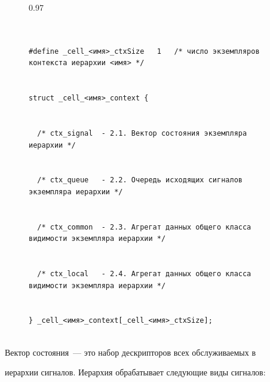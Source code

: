       \begin{figure}\scriptsize %


\begin{center}


\begin{fmpage}{0.97\textwidth}


\begin{verbatim}


#define _cell_<имя>_ctxSize   1   /* число экземпляров контекста иерархии <имя> */ 


struct _cell_<имя>_context { 


  /* ctx_signal  - 2.1. Вектор состояния экземпляра иерархии */ 


  /* ctx_queue   - 2.2. Очередь исходящих сигналов экземпляра иерархии */ 


  /* ctx_common  - 2.3. Агрегат данных общего класса видимости экземпляра иерархии */ 


  /* ctx_local   - 2.4. Агрегат данных общего класса видимости экземпляра иерархии */ 


} _cell_<имя>_context[_cell_<имя>_ctxSize];


\end{verbatim}


\end{fmpage}


\end{center}


\vspace*{-6pt}






\end{figure}


      


      Вектор состояния~--- это набор дескрипторов всех обслуживаемых в 


иерархии сигналов. Иерархия обрабатывает следующие виды сигналов:


